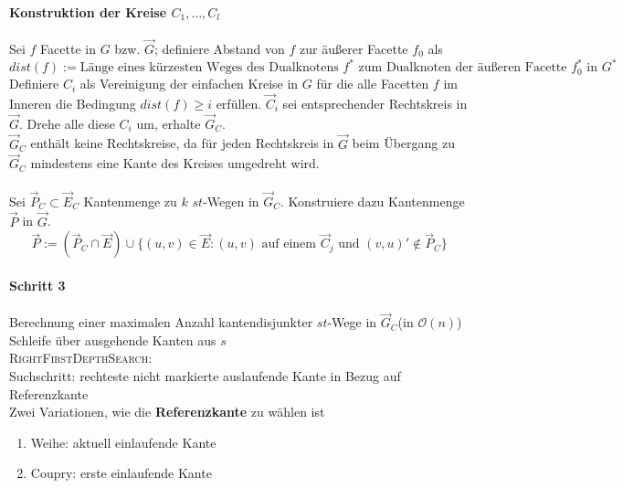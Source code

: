 \documentclass{article}
\newcommand{\df}[1]{\textbf{#1}\index{#1}}
\renewcommand{\O}[1]{\mathcal{O}\left(#1\right)}
\begin{document}
\paragraph{Konstruktion der Kreise $C_1, \ldots, C_l$}
Sei $f$ Facette in $G$ bzw. $\overrightarrow{G}$; definiere Abstand von $f$ zur äußerer Facette $f_0$ als
\[dist(f) := \text{Länge eines kürzesten Weges des Dualknotens }f^* \text{ zum Dualknoten der äußeren Facette }f_0^* \text{ in }G^*\]
Definiere $C_i$ als Vereinigung der einfachen Kreise in $G$ für die alle Facetten $f$ im Inneren die Bedingung $dist(f) \geq i$ erfüllen. $\overrightarrow{C}_i$ sei entsprechender Rechtskreis in $\overrightarrow{G}$.
Drehe alle diese $C_i$ um, erhalte $\overrightarrow{G}_C$.\\


$\overrightarrow{G}_C$ enthält keine Rechtskreise, da für jeden Rechtskreis in $\overrightarrow{G}$ beim Übergang zu $\overrightarrow{G}_C$ mindestens eine Kante des Kreises umgedreht wird.\\\\

Sei $\overrightarrow{P}_C \subset \overrightarrow{E}_C$ Kantenmenge zu $k$ $st$-Wegen in $\overrightarrow{G}_C$. Konstruiere dazu Kantenmenge $\overrightarrow{P}$ in $\overrightarrow{G}$.
\[\overrightarrow{P} := (\overrightarrow{P}_C \cap \overrightarrow{E})\cup
\{(u,v) \in \overrightarrow{E}: (u,v) \text{ auf einem }\overrightarrow{C}_j \text{ und }(v,u)' \notin \overrightarrow{P}_C \}
\]

\paragraph{Schritt 3}
Berechnung einer maximalen Anzahl kantendisjunkter $st$-Wege in $\overrightarrow{G}_C$(in $\O{n}$)\\
Schleife über ausgehende Kanten aus $s$\\
\textsc{RightFirstDepthSearch}:\\
Suchschritt: rechteste nicht markierte auslaufende Kante in Bezug auf Referenzkante\\
Zwei Variationen, wie die \df{Referenzkante} zu wählen ist
\begin{enumerate}
	\item Weihe: aktuell einlaufende Kante
	\item Coupry: erste einlaufende Kante
\end{enumerate}
\end{document}
